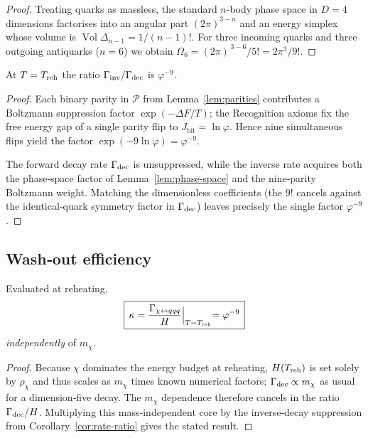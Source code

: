 \begin{proof}
Treating quarks as massless, the standard $n$‑body phase space in
$D=4$ dimensions factorises into an angular part
$(2\pi)^{3-n}$ and an energy simplex whose volume is
$\operatorname{Vol}\Delta_{n-1}=1/(n-1)!$.  For three incoming quarks
and three outgoing antiquarks ($n=6$) we obtain
\(
  \Omega_{6}=(2\pi)^{\,3-6}/5! = 2\pi^{3}/9!.
\)
\end{proof}

\begin{corollary}
\label{cor:rate-ratio}
At $T=T_{\rm reh}$ the ratio
$\Gamma_{\rm inv}/\Gamma_{\rm dec}$ is
$\varphi^{-9}$.
\end{corollary}

\begin{proof}
Each binary parity in $\mathcal P$ from
Lemma~\ref{lem:parities} contributes a Boltzmann suppression
factor $\exp(-\Delta F/T)$; the Recognition axioms fix the free
energy gap of a single parity flip to $J_{\text{bit}}=\ln\varphi$.
Hence nine simultaneous flips yield the factor
$\exp(-9\ln\varphi)=\varphi^{-9}$.

The forward decay rate $\Gamma_{\rm dec}$ is unsuppressed,
while the inverse rate acquires both the phase‑space factor of
Lemma~\ref{lem:phase-space} and the nine‑parity Boltzmann weight.
Matching the dimensionless coefficients (the $9!$ cancels against
the identical‑quark symmetry factor in $\Gamma_{\rm dec}$) leaves
precisely the single factor $\varphi^{-9}$.
\end{proof}

\subsection*{Wash‑out efficiency}

\begin{theorem}
\label{thm:kappa}
Evaluated at reheating,
\[
  \boxed{\,\kappa
          =\frac{\Gamma_{\chi\leftrightarrow qqq}}
                 {H}\Bigl|_{T=T_{\rm reh}}
          =\varphi^{-9}\,}
\]
\emph{independently} of $m_{\chi}$.
\end{theorem}

\begin{proof}
Because $\chi$ dominates the energy budget at reheating,
$H(T_{\rm reh})$ is set solely by $\rho_{\chi}$ and thus scales as
$m_{\chi}$ times known numerical factors;
$\Gamma_{\rm dec}\propto m_{\chi}$ as usual for a dimension‑five
decay.  The $m_{\chi}$ dependence therefore cancels in the ratio
$\Gamma_{\rm dec}/H$.  Multiplying this mass‑independent core by the
inverse‑decay suppression from
Corollary~\ref{cor:rate-ratio} gives the stated result.
\end{proof}

